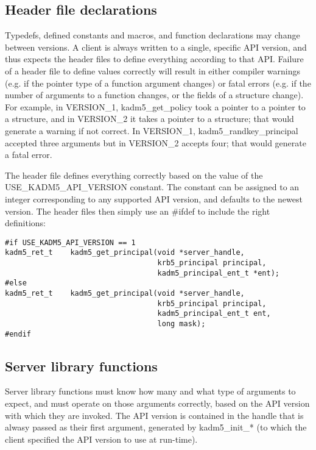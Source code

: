 \subsection{Header file declarations}

Typedefs, defined constants and macros, and function declarations may
change between versions.  A client is always written to a single,
specific API version, and thus expects the header files to define
everything according to that API.  Failure of a header file to define
values correctly will result in either compiler warnings (e.g. if the
pointer type of a function argument changes) or fatal errors (e.g. if
the number of arguments to a function changes, or the fields of a
structure change).  For example, in VERSION_1, kadm5_get_policy took a
pointer to a pointer to a structure, and in VERSION_2 it takes a
pointer to a structure; that would generate a warning if not correct.
In VERSION_1, kadm5_randkey_principal accepted three arguments but in
VERSION_2 accepts four; that would generate a fatal error.

The header file defines everything correctly based on the value of the
USE_KADM5_API_VERSION constant.  The constant can be assigned to an
integer corresponding to any supported API version, and defaults to
the newest version.  The header files then simply use an \#ifdef to
include the right definitions:
%
\begin{verbatim}
#if USE_KADM5_API_VERSION == 1
kadm5_ret_t    kadm5_get_principal(void *server_handle,
                                   krb5_principal principal,
                                   kadm5_principal_ent_t *ent);
#else
kadm5_ret_t    kadm5_get_principal(void *server_handle,
                                   krb5_principal principal,
                                   kadm5_principal_ent_t ent,
                                   long mask);
#endif
\end{verbatim}

\subsection{Server library functions}

Server library functions must know how many and what type of arguments
to expect, and must operate on those arguments correctly, based on the
API version with which they are invoked.  The API version is contained
in the handle that is alwasy passed as their first argument, generated
by kadm5_init_* (to which the client specified the API version to use
at run-time).

